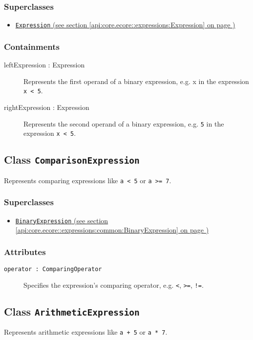 \subsubsection*{Superclasses}
\begin{itemize}
\item \hyperref[api:core.ecore::expressions:Expression]{\texttt{Expression} (see section \ref*{api:core.ecore::expressions:Expression} on page \pageref*{api:core.ecore::expressions:Expression})}
\end{itemize}
\subsubsection*{Containments}
\begin{description}
\item[leftExpression : Expression] Represents the first operand of a binary expression, e.g. x in the expression \texttt{x < 5}.
\item[rightExpression : Expression] Represents the second operand of a binary expression, e.g. \texttt{5} in the expression \texttt{x < 5}.
\end{description}
\subsection{Class \texttt{ComparisonExpression}}
\label{api:core.ecore::expressions:common:ComparisonExpression}
Represents comparing expressions like \texttt{a < 5} or \texttt{a >= 7}.
\subsubsection*{Superclasses}
\begin{itemize}
\item \hyperref[api:core.ecore::expressions:common:BinaryExpression]{\texttt{BinaryExpression} (see section \ref*{api:core.ecore::expressions:common:BinaryExpression} on page \pageref*{api:core.ecore::expressions:common:BinaryExpression})}
\end{itemize}
\subsubsection*{Attributes}
\begin{description}
\item[\texttt{operator~:~ComparingOperator}] Specifies the expression's comparing operator, e.g. \texttt{<}, \texttt{>=}, \texttt{!=}.
\end{description}
\subsection{Class \texttt{ArithmeticExpression}}
\label{api:core.ecore::expressions:common:ArithmeticExpression}
Represents arithmetic expressions like \texttt{a + 5} or \texttt{a * 7}.
